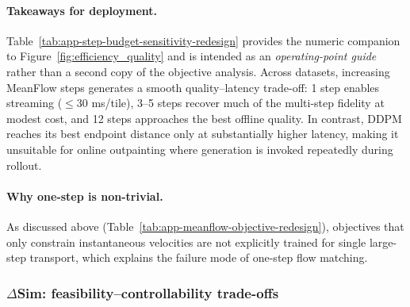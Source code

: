 \documentclass{article}
\theoremstyle{plain}
\theoremstyle{definition}
\theoremstyle{remark}
\begin{document}
\paragraph{Takeaways for deployment.}
Table~\ref{tab:app-step-budget-sensitivity-redesign} provides the numeric companion to Figure~\ref{fig:efficiency_quality} and is intended as an \emph{operating-point guide} rather than a second copy of the objective analysis.
Across datasets, increasing MeanFlow steps generates a smooth quality--latency trade-off: 1 step enables streaming (\(\le 30\) ms/tile), 3--5 steps recover much of the multi-step fidelity at modest cost, and 12 steps approaches the best offline quality.
In contrast, DDPM reaches its best endpoint distance only at substantially higher latency, making it unsuitable for online outpainting where generation is invoked repeatedly during rollout.

\paragraph{Why one-step is non-trivial.}
As discussed above (Table~\ref{tab:app-meanflow-objective-redesign}), objectives that only constrain instantaneous velocities are not explicitly trained for single large-step transport, which explains the failure mode of one-step flow matching.

\subsubsection{\(\Delta\)Sim: feasibility--controllability trade-offs}
\label{app:extraexp:deltasim}
\end{document}
